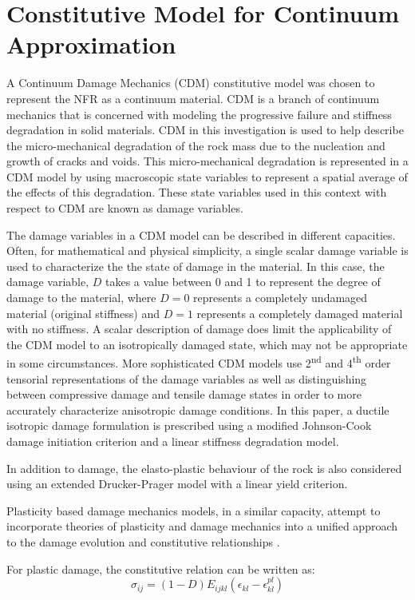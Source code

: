 \section{Constitutive Model for Continuum Approximation}

A Continuum Damage Mechanics (CDM) constitutive model was chosen to represent the NFR as a continuum material. CDM is a branch of continuum mechanics that is concerned with modeling the progressive failure and stiffness degradation in solid materials. CDM in this investigation is used to help describe the micro-mechanical degradation of the rock mass due to the nucleation and growth of cracks and voids. This micro-mechanical degradation is represented in a CDM model by using macroscopic state variables to represent a spatial average of the effects of this degradation. These state variables used in this context with respect to CDM are known as damage variables. 

The damage variables in a CDM model can be described in different capacities. Often, for mathematical and physical simplicity, a single scalar damage variable is used to characterize the the state of damage in the material. In this case, the damage variable, $D$ takes a value between 0 and 1 to represent the degree of damage to the material, where $D=0$ represents a completely undamaged material (original stiffness) and $D=1$ represents a completely damaged material with no stiffness. A scalar description of damage does limit the applicability of the CDM model to an isotropically damaged state, which may not be appropriate in some circumstances. More sophisticated CDM models use 2\textsuperscript{nd} and 4\textsuperscript{th} order tensorial representations of the damage variables as well as distinguishing between compressive damage and tensile damage states in order to more accurately characterize anisotropic damage conditions. In this paper, a ductile isotropic damage formulation is prescribed using a modified Johnson-Cook damage initiation criterion and a linear stiffness degradation model.

In addition to damage, the elasto-plastic behaviour of the rock is also considered using an extended Drucker-Prager model with a linear yield criterion.  

Plasticity based damage mechanics models, in a similar capacity, attempt to incorporate theories of plasticity and damage mechanics into a unified approach to the damage evolution and constitutive relationships \cite{zhang_continuum_2010}. 

For plastic damage, the constitutive relation can be written as:
\begin{equation}
\sigma_{ij}=\left(1-D\right)E_{ijkl}\left(\epsilon_{kl}-\epsilon^{pl}_{kl}\right)
\label{eqn:const5}
\end{equation}

